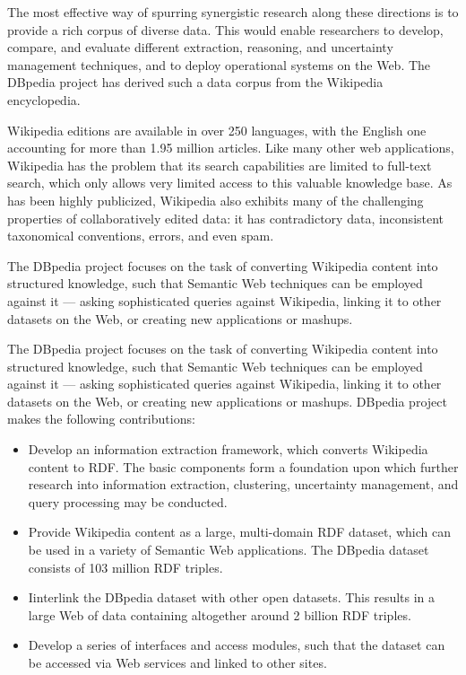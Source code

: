 \documentclass[thesis=M,english,hidelinks]{FITthesis}[2019/12/23]
\begin{document}
The most effective way of spurring synergistic research along these directions is to provide a rich corpus of diverse data. This would enable researchers to develop, compare, and evaluate different extraction, reasoning, and uncertainty management techniques, and to deploy operational systems on the Web. The DBpedia project has derived such a data corpus from the Wikipedia encyclopedia.

Wikipedia editions are available in over 250 languages, with the English one accounting for more than 1.95 million articles. Like many other web applications, Wikipedia has the problem that its search capabilities are limited to full-text search, which only allows very limited access to this valuable knowledge base. As has been highly publicized, Wikipedia also exhibits many of the challenging properties of collaboratively edited data: it has contradictory data, inconsistent taxonomical conventions, errors, and even spam. 

The DBpedia project focuses on the task of converting Wikipedia content into structured knowledge, such that Semantic Web techniques can be employed against it — asking sophisticated queries against Wikipedia, linking it to other datasets on the Web, or creating new applications or mashups.

The DBpedia project focuses on the task of converting Wikipedia content into structured knowledge, such that Semantic Web techniques can be employed against it — asking sophisticated queries against Wikipedia, linking it to other datasets on the Web, or creating new applications or mashups. DBpedia project makes the following contributions:
\begin{itemize}
	\item Develop an information extraction framework, which converts Wikipedia
	content to RDF. The basic components form a foundation upon which further research into information extraction, clustering, uncertainty management, and query processing may be conducted.
	\item Provide Wikipedia content as a large, multi-domain RDF dataset, which
	can be used in a variety of Semantic Web applications. The DBpedia dataset
	consists of 103 million RDF triples.
	\item Iinterlink the DBpedia dataset with other open datasets. This results in
	a large Web of data containing altogether around 2 billion RDF triples.
	\item Develop a series of interfaces and access modules, such that the dataset
	can be accessed via Web services and linked to other sites.
\end{itemize}
\end{document}
